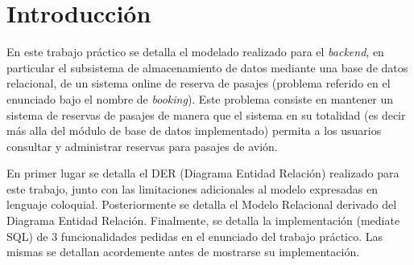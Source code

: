 \section{Introducci\'on}

En este trabajo pr\'actico se detalla el modelado realizado para
el \textit{backend}, en particular el subsistema de almacenamiento 
de datos mediante una base de datos relacional, de un sistema online
de reserva de pasajes (problema referido en el enunciado bajo el nombre
de \textit{booking}). Este problema consiste en mantener un sistema de
reservas de pasajes de manera que el sistema en su totalidad (es decir
m\'as alla del m\'odulo de base de datos implementado) permita a los
usuarios consultar y administrar reservas para pasajes de avi\'on.

En primer lugar se detalla el DER (Diagrama Entidad Relaci\'on) realizado
para este trabajo, junto con las limitaciones adicionales al modelo expresadas
en lenguaje coloquial. Posteriormente se detalla el Modelo Relacional derivado
del Diagrama Entidad Relaci\'on. Finalmente, se detalla la implementaci\'on
(mediate SQL) de 3 funcionalidades pedidas en el enunciado del trabajo pr\'actico.
Las mismas se detallan acordemente antes de mostrarse su implementaci\'on.
